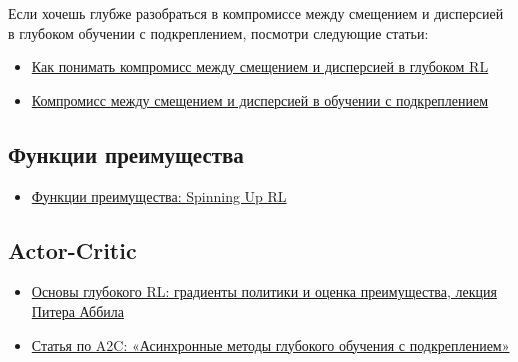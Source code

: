 \documentclass[11pt,a4paper]{article}
\begin{document}
Если хочешь глубже разобраться в компромиссе между смещением и дисперсией в глубоком обучении с подкреплением, посмотри следующие статьи:

\begin{itemize}
\tightlist
\item
  \href{https://blog.mlreview.com/making-sense-of-the-bias-variance-trade-off-in-deep-reinforcement-learning-79cf1e83d565}{Как понимать компромисс между смещением и дисперсией в глубоком RL}
\item
  \href{https://www.endtoend.ai/blog/bias-variance-tradeoff-in-reinforcement-learning/}{Компромисс между смещением и дисперсией в обучении с подкреплением}
\end{itemize}

\subsection{Функции преимущества}\label{advantage-functions}

\begin{itemize}
\tightlist
\item
  \href{https://spinningup.openai.com/en/latest/spinningup/rl_intro.html?highlight=advantage\%20functio\#advantage-functions}{Функции преимущества: Spinning Up RL}
\end{itemize}

\subsection{Actor-Critic}\label{actor-critic}

\begin{itemize}
\tightlist
\item
  \href{https://www.youtube.com/watch?v=AKbX1Zvo7r8}{Основы глубокого RL: градиенты политики и оценка преимущества, лекция Питера Аббила}
\item
  \href{https://arxiv.org/abs/1602.01783v2}{Статья по A2C: «Асинхронные методы глубокого обучения с подкреплением»}
\end{itemize}
\end{document}
